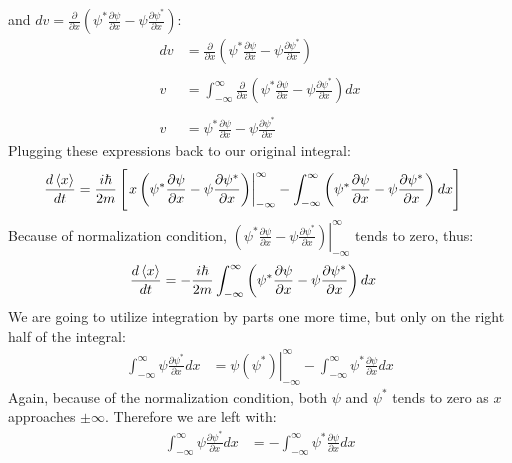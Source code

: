 \documentclass[hidelinks, a4paper, 12pt]{article}
\begin{document}
            and $dv = \frac{\partial}{\partial x} \left(\psi^* \frac{\partial \psi}{\partial x} - \psi \frac{\partial \psi^*}{\partial x}\right)$:
            \[\begin{split}
                dv &= \frac{\partial}{\partial x} \left(\psi^* \frac{\partial \psi}{\partial x} - \psi \frac{\partial \psi^*}{\partial x}\right)\\
                \\
                v &= \int_{-\infty}^{\infty} \frac{\partial}{\partial x} \left(\psi^* \frac{\partial \psi}{\partial x} - \psi \frac{\partial \psi^*}{\partial x}\right) dx\\
                \\
                v &= \psi^* \frac{\partial \psi}{\partial x} - \psi \frac{\partial \psi^*}{\partial x}
            \end{split}\]
            Plugging these expressions back to our original integral:
            \[\begin{split}
                \frac{d\braket{x}}{dt} &= \frac{i\hbar}{2m} \left[\left. x \left( \psi^* \frac{\partial \psi}{\partial x} - \psi \frac{\partial \psi^*}{\partial x} \right) \right\rvert_{-\infty}^{\infty} - \int_{-\infty}^{\infty} \left( \psi^* \frac{\partial \psi}{\partial x} - \psi \frac{\partial \psi^*}{\partial x} \right)dx \right]
            \end{split}\]
            Because of normalization condition, $\left. \left( \psi^* \frac{\partial \psi}{\partial x} - \psi \frac{\partial \psi^*}{\partial x} \right) \right\rvert_{-\infty}^{\infty}$ tends to zero, thus:
            \[\begin{split}
                \frac{d\braket{x}}{dt} &= -\frac{i\hbar}{2m} \int_{-\infty}^{\infty} \left( \psi^* \frac{\partial \psi}{\partial x} - \psi \frac{\partial \psi^*}{\partial x} \right)dx
            \end{split}\]
            We are going to utilize integration by parts one more time, but only on the right half of the integral:
            \[\begin{split}
                \int_{-\infty}^{\infty} \psi \frac{\partial \psi^*}{\partial x} dx &= \left. \psi (\psi^*) \right\rvert_{-\infty}^{\infty} - \int_{-\infty}^{\infty} \psi^* \frac{\partial \psi}{\partial x} dx
            \end{split}\]
            Again, because of the normalization condition, both $\psi$ and $\psi^*$ tends to zero as $x$ approaches $\pm \infty$. Therefore we are left with:
            \[\begin{split}
                \int_{-\infty}^{\infty} \psi \frac{\partial \psi^*}{\partial x} dx &= - \int_{-\infty}^{\infty} \psi^* \frac{\partial \psi}{\partial x} dx
            \end{split}\]
\end{document}
